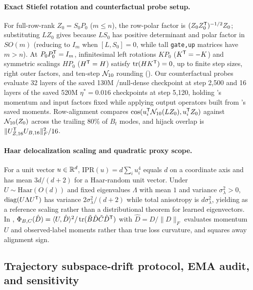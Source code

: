 \paragraph{Exact Stiefel rotation and counterfactual probe setup.}
For full-row-rank $Z_0=S_0P_0$ ($m\le n$), the row-polar factor is $(Z_0Z_0^{{\mathsf{T}}})^{-1/2}Z_0$; substituting $LZ_0$ gives  because $LS_0$ has positive determinant and polar factor in $SO(m)$ (reducing to $I_m$ when $[L,S_0]=0$, while tall \texttt{gate,up} matrices have $m>n$). At $P_0P_0^{{\mathsf{T}}}=I_m$, infinitesimal left rotations $KP_0$ ($K^{{\mathsf{T}}}=-K$) and symmetric scalings $HP_0$ ($H^{{\mathsf{T}}}=H$) satisfy $\operatorname{tr}(HK^{{\mathsf{T}}})=0$, up to finite step sizes, right outer factors, and ten-step $\mathcal{N}_{10}$ rounding (). Our counterfactual probes evaluate 32 layers of the saved 130M /null-dense checkpoint at step 2,500 and 16 layers of the saved 520M $\eta^*=0.016$ checkpoints at step 5,120, holding 's momentum and input factors fixed while applying output operators built from 's saved moments. Row-alignment compares $\cos(u_i^{{\mathsf{T}}}\mathcal{N}_{10}(LZ_0),u_i^{{\mathsf{T}}}Z_0)$ against $\mathcal{N}_{10}(Z_0)$ across the trailing 80\% of $B_t$ modes, and hijack overlap is $\|U_{Z,16}^{{\mathsf{T}}}U_{B,16}\|_F^2/16$.



\paragraph{Haar delocalization scaling and quadratic proxy scope.}
For a unit vector $u\in\mathbb{R}^d$, $\mathrm{IPR}(u)=d\sum_i u_i^4$ equals $d$ on a coordinate axis and has mean $3d/(d+2)$ for a Haar-random unit vector. Under $U\sim\mathrm{Haar}(O(d))$ and fixed eigenvalues $\Lambda$ with mean $1$ and variance $\sigma_\lambda^2>0$, $\operatorname{diag}(U\Lambda U^{{\mathsf{T}}})$ has variance $2\sigma_\lambda^2/(d+2)$ while total anisotropy is $d\sigma_\lambda^2$, yielding  as a reference scaling rather than a distributional theorem for learned eigenvectors. In , $\Phi_{B,C}(\hat D)=\langle U,\hat D\rangle^2/\operatorname{tr}(\tilde B\hat D\tilde C\hat D^{{\mathsf{T}}})$ with $\hat D=D/\|D\|_F$ evaluates momentum $U$ and observed-label moments rather than true loss curvature, and squares away alignment sign.

\subsection{Trajectory subspace-drift protocol, EMA audit, and sensitivity}
\label{app:drift_details}

